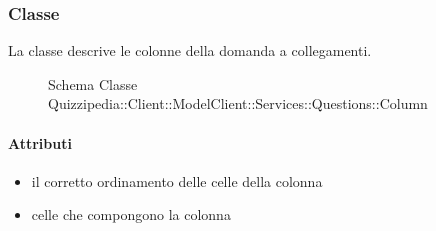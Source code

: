 \subsubsection{Classe }
La classe descrive le colonne della domanda a collegamenti.
\begin{figure}[H]
\centering
\noindent{}
\caption[Schema Classe Column]{Schema Classe Quizzipedia::Client::ModelClient::Services::Questions::Column}
\end{figure}
\paragraph{Attributi}
\begin{itemize}
\item {}
\newline
il corretto ordinamento delle celle della colonna
\item {}
\newline
celle che compongono la colonna
\end{itemize}

